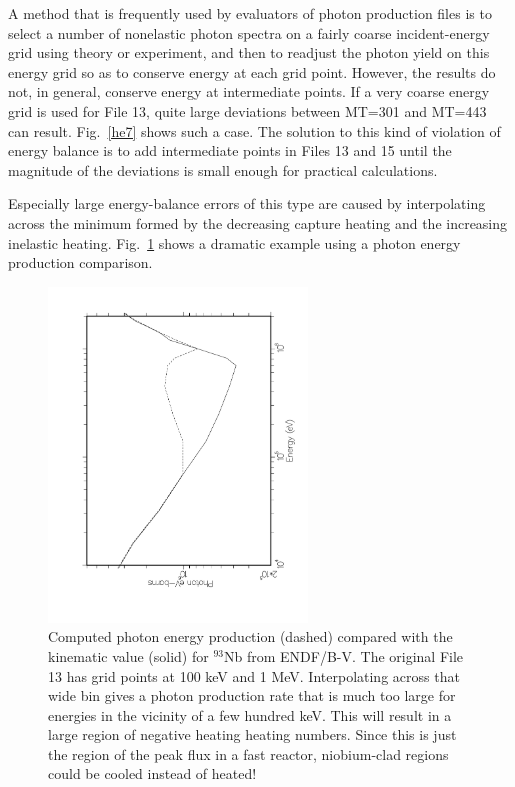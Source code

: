 A method that is frequently used by evaluators of photon production
files is to select a number of nonelastic photon spectra on a
fairly coarse incident-energy grid using theory or experiment,
and then to readjust the photon yield on this energy grid so as
to conserve energy at each grid point.  However, the results do
not, in general, conserve energy at intermediate points.  If a
very coarse energy grid is used for File 13, quite large
deviations between MT=301 and MT=443 can result.  Fig.~\ref{he7}
shows such a case.  The solution to this kind of violation of
energy balance is to add intermediate points in Files 13 and 15
until the magnitude of the deviations is small enough for
practical calculations.

Especially large energy-balance errors of this type are caused
by interpolating across the minimum formed by the decreasing
capture heating and the increasing inelastic heating.
Fig.~\ref{he8} shows a dramatic example using a photon energy
production comparison.

\begin{figure}[bp]\centering
\includegraphics[keepaspectratio,height=3.5in, angle=270]{figs/heatr8ack}
\caption[Computed photon energy production and kinematic values]{Computed
 photon energy production (dashed) compared with the kinematic value
 (solid) for $^{93}$Nb from ENDF/B-V.  The original File 13 has grid points
 at 100 keV and 1 MeV.  Interpolating across that wide bin gives a photon
 production rate that is much too large for energies in the vicinity of a few
 hundred keV.  This will result in a large region of negative heating
 heating numbers.  Since this is just the region of the peak flux in a fast
 reactor, niobium-clad regions could be cooled instead of heated!}
\label{he8}
\end{figure}


